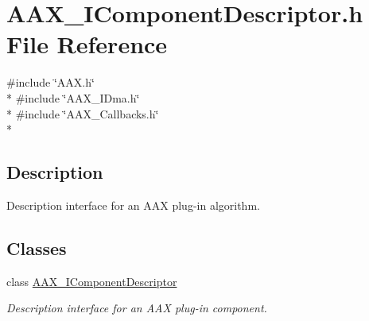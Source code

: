 \hypertarget{a00237}{}\section{A\+A\+X\+\_\+\+I\+Component\+Descriptor.\+h File Reference}
\label{a00237}
{\ttfamily \#include \char`\"{}A\+A\+X.\+h\char`\"{}}\\*
{\ttfamily \#include \char`\"{}A\+A\+X\+\_\+\+I\+Dma.\+h\char`\"{}}\\*
{\ttfamily \#include \char`\"{}A\+A\+X\+\_\+\+Callbacks.\+h\char`\"{}}\\*


\subsection{Description}
Description interface for an A\+A\+X plug-\/in algorithm. 

\subsection*{Classes}
\begin{DoxyCompactItemize}
\item 
class \hyperlink{a00088}{A\+A\+X\+\_\+\+I\+Component\+Descriptor}
\begin{DoxyCompactList}\small\item\em Description interface for an A\+A\+X plug-\/in component. \end{DoxyCompactList}\end{DoxyCompactItemize}
